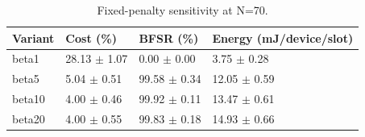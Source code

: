 \begin{table}[t]
\centering
\caption{Fixed-penalty sensitivity at N=70.}
\label{tab:penalty_sensitivity}
\begin{tabular}{llll}
\toprule
Variant & Cost (\%) & BFSR (\%) & Energy (mJ/device/slot) \\
\midrule
beta1 & 28.13 $\pm$ 1.07 & 0.00 $\pm$ 0.00 & 3.75 $\pm$ 0.28 \\
beta5 & 5.04 $\pm$ 0.51 & 99.58 $\pm$ 0.34 & 12.05 $\pm$ 0.59 \\
beta10 & 4.00 $\pm$ 0.46 & 99.92 $\pm$ 0.11 & 13.47 $\pm$ 0.61 \\
beta20 & 4.00 $\pm$ 0.55 & 99.83 $\pm$ 0.18 & 14.93 $\pm$ 0.66 \\
\bottomrule
\end{tabular}
\end{table}
